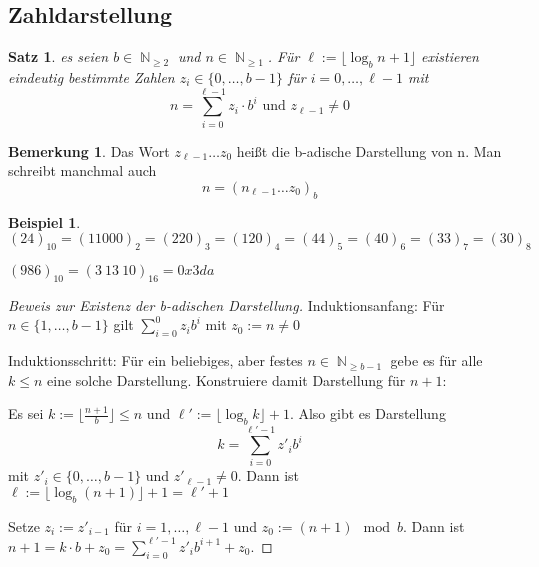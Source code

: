 \documentclass[a4paper,12pt]{article}
\DeclareMathOperator{\N}{\mathbb N}
\newtheorem{satz}[axiom]{Satz}
\theoremstyle{definition}
\newtheorem*{example}{Beispiel}
\newtheorem*{bemerkung}{Bemerkung}
\begin{document}
	\subsection{Zahldarstellung}
	\begin{satz}
		es seien $b \in \N_{\geq 2}$ und $n\in \N_{\geq 1}$. Für $\ell := \lfloor \log_b n + 1\rfloor$ existieren eindeutig bestimmte Zahlen $z_i \in \{0,\dots,b-1\}$ für $i = 0,\dots,\ell-1$ mit 
		\[
			n = \sum_{i = 0}^{\ell - 1}z_i \cdot b^i \text{ und } z_{\ell-1} \neq 0
		\]
	\end{satz}
	\begin{bemerkung}
		Das Wort $z_{\ell-1}\dots z_0$ heißt die b-adische Darstellung von n. Man schreibt manchmal auch
		\[
			n = (n_{\ell-1}\dots z_0)_b
		\]
	\end{bemerkung}
	\begin{example}
		$(24)_{10} = (11000)_2 = (220)_3 = (120)_4 = (44)_5 = (40)_6 = (33)_7 = (30)_8$
		
		$(986)_{10} = (3~13~10)_{16} = 0x3da$
	\end{example}
	\begin{proof}[Beweis zur Existenz der b-adischen Darstellung]
		Induktionsanfang: Für $n \in \{1,\dots,b-1\}$ gilt $\sum_{i=0}^{0}z_i b^i$ mit $z_0 := n \neq 0$
		
		Induktionsschritt: Für ein beliebiges, aber festes $n \in \N_{\geq b-1}$ gebe es für alle $k\leq n$ eine solche Darstellung. Konstruiere damit Darstellung für $n+1$: 
		
		Es sei $k := \lfloor \frac{n+1}{b}\rfloor \leq n$ und $\ell' := \lfloor \log_b k\rfloor + 1$. Also gibt es Darstellung 
		\[
			k = \sum_{i = 0}^{\ell'-1}z'_i b^i
		\]
		mit $z'_i\in \{0,\dots,b-1\}$ und $z'_{\ell-1} \neq 0$.	Dann ist $\ell := \lfloor \log_b(n+1)\rfloor + 1 = \ell' + 1$
		
		Setze $z_i :=z'_{i-1}$ für $i=1,\dots,\ell-1$ und $z_0 := (n+1) \mod b$. Dann ist $n+1 = k\cdot b + z_0 = \sum_{i = 0}^{\ell'-1}z'_i b^{i+1} + z_0$.
	\end{proof}
\end{document}
